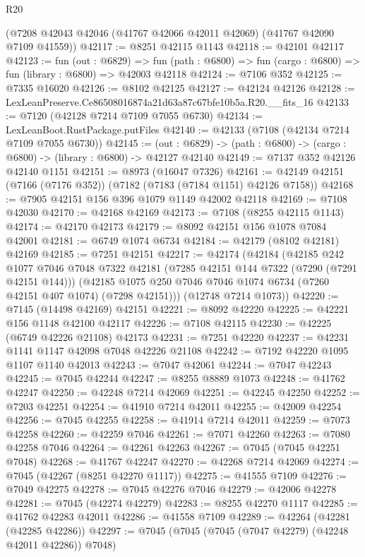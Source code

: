 \begin{lexlean}{R20}
\begin{coremodule}
{    (@7208 @42043 @42046 (@41767 @42066 @42011 @42069) (@41767 @42090 @7109 @41559))
@42117 := @8251 @42115 @1143
@42118 := @42101 @42117
@42123 := fun (out : @6829) =>
  fun (path : @6800) => fun (cargo : @6800) => fun (library : @6800) => @42003 @42118
@42124 := @7106 @352
@42125 := @7335 @16020
@42126 := @8102 @42125
@42127 := @42124 @42126
@42128 := LexLeanPreserve.Ce86508016874a21d63a87c67bfe10b5a.R20.__fits_16
@42133 := @7120 (@42128 @7214 @7109 @7055 @6730)
@42134 := LexLeanBoot.RustPackage.putFiles
@42140 := @42133 (@7108 (@42134 @7214 @7109 @7055 @6730))
@42145 := (out : @6829) -> (path : @6800) -> (cargo : @6800) -> (library : @6800) -> @42127 @42140
@42149 := @7137 @352 @42126 @42140 @1151
@42151 := @8973 (@16047 @7326)
@42161 := @42149 @42151 (@7166 (@7176 @352)) (@7182 (@7183 (@7184 @1151) @42126 @7158))
@42168 := @7905 @42151 @156 @396 @1079 @1149 @42002 @42118
@42169 := @7108 @42030
@42170 := @42168 @42169
@42173 := @7108 (@8255 @42115 @1143)
@42174 := @42170 @42173
@42179 := @8092 @42151 @156 @1078 @7084 @42001
@42181 := @6749 @1074 @6734
@42184 := @42179 (@8102 @42181) @42169
@42185 := @7251 @42151
@42217 := @42174
    (@42184
      (@42185
        @242
        @1077
        @7046
        @7048
        @7322
        @42181
        (@7285 @42151 @144 @7322 (@7290 (@7291 @42151 @144)))
        (@42185 @1075 @250 @7046 @7046 @1074 @6734 (@7260 @42151 @407 @1074) (@7298 @42151)))
      (@12748 @7214 @1073))
@42220 := @7145 (@14498 @42169) @42151
@42221 := @8092 @42220
@42225 := @42221 @156 @1148 @42100 @42117
@42226 := @7108 @42115
@42230 := @42225 (@6749 @42226 @21108) @42173
@42231 := @7251 @42220
@42237 := @42231 @1141 @1147 @42098 @7048 @42226 @21108
@42242 := @7192 @42220 @1095 @1107 @1140 @42013
@42243 := @7047 @42061
@42244 := @7047 @42243
@42245 := @7045 @42244
@42247 := @8255 @8889 @1073
@42248 := @41762 @42247
@42250 := @42248 @7214 @42069
@42251 := @42245 @42250
@42252 := @7203 @42251
@42254 := @41910 @7214 @42011
@42255 := @42009 @42254
@42256 := @7045 @42255
@42258 := @41914 @7214 @42011
@42259 := @7073 @42258
@42260 := @42259 @7046
@42261 := @7071 @42260
@42263 := @7080 @42258 @7046
@42264 := @42261 @42263
@42267 := @7045 (@7045 @42251 @7048)
@42268 := @41767 @42247
@42270 := @42268 @7214 @42069
@42274 := @7045 (@42267 (@8251 @42270 @1117))
@42275 := @41555 @7109
@42276 := @7049 @42275
@42278 := @7045 @42276 @7046
@42279 := @42006 @42278
@42281 := @7045 (@42274 @42279)
@42283 := @8255 @42270 @1117
@42285 := @41762 @42283 @42011
@42286 := @41558 @7109
@42289 := @42264 (@42281 (@42285 @42286))
@42297 := @7045 (@7045 (@7045 (@7047 @42279) (@42248 @42011 @42286)) @7048)
}
\end{coremodule}
\end{lexlean}
